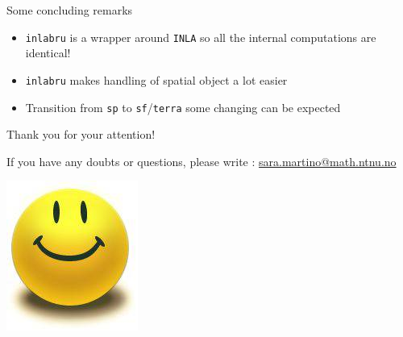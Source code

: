 \documentclass[
  ignorenonframetext,
]{beamer}
\begin{document}
\begin{frame}[fragile]{Some concluding remarks}
\protect\hypertarget{some-concluding-remarks}{}
\begin{itemize}
\item
  \texttt{inlabru} is a wrapper around \texttt{INLA} so all the internal
  computations are identical!
\item
  \texttt{inlabru} makes handling of spatial object a lot easier
\item
  Transition from \texttt{sp} to \texttt{sf}/\texttt{terra} some
  changing can be expected
\end{itemize}
\end{frame}

\begin{frame}{}
\protect\hypertarget{section-1}{}
\Large

Thank you for your attention!

\normalsize

If you have any doubts or questions, please write :
\url{sara.martino@math.ntnu.no}

\begin{center}\includegraphics[width=0.3\linewidth]{graphics/smiley_small} \end{center}
\end{frame}
\end{document}
